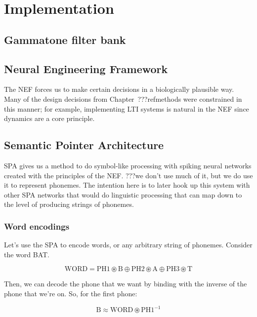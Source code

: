 \chapter{Implementation}



\section{Gammatone filter bank}

\section{Neural Engineering Framework}

The NEF forces us to make certain decisions
in a biologically plausible way.
Many of the design decisions from Chapter~???refmethods
were constrained in this manner;
for example, implementing LTI systems is natural
in the NEF since dynamics are a core principle.

\section{Semantic Pointer Architecture}

SPA gives us a method to do symbol-like processing
with spiking neural networks created
with the principles of the NEF.
???we don't use much of it,
but we do use it to represent phonemes.
The intention here is to later hook up
this system with other SPA networks
that would do linguistic processing
that can map down to the level of
producing strings of phonemes.

\subsection{Word encodings}

Let's use the SPA to encode words,
or any arbitrary string of phonemes.
Consider the word BAT.

$$\text{WORD} = \text{PH1} \circledast \text{B}
  \oplus \text{PH2} \circledast \text{A}
  \oplus \text{PH3} \circledast \text{T}$$

Then, we can decode the phone that we want
by binding with the inverse of the
phone that we're on.
So, for the first phone:

$$\text{B} \approx \text{WORD} \circledast \text{PH1}^{-1}$$

